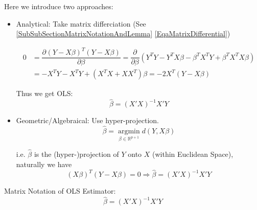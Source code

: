     Here we introduce two approaches:
\begin{itemize}[topsep=2pt,itemsep=2pt]
    \item Analytical: Take matrix differciation (See \autoref{SubSubSectionMatrixNotationAndLemma} \autoref{EqaMatrixDifferential})
    
   

\begin{align}
    0&=\dfrac{\partial^{} (Y-X\beta )^T(Y-X\beta ) }{\partial \beta ^{}} =\dfrac{\partial^{} }{\partial\beta  ^{}}(Y^TY- Y^TX\beta -\beta ^TX^TY+\beta ^TX^TX\beta )\\ 
    &=-X^TY-X^TY+(X^TX+XX^T)\beta 
    =-2X^T(Y-X\beta )
\end{align}
    
    Thus we get OLS:
    \begin{equation}
        \hat{\beta }=(X'X)^{-1}X'Y 
    \end{equation}
    
    
    \item Geometric/Algebraical: Use hyper-projection.
    \begin{equation}
        \hat{\beta }=\mathop{ \arg\min }\limits_{\beta \in \mathbb{R}^{p+1} } d(Y,X\beta )
    \end{equation}

    i.e. $ \hat{\beta } $ is the (hyper-)projection of $ Y $ onto $ X $ (within Euclidean Space), naturally we have
    \begin{equation}
        (X\beta )^T(Y-X\beta )=0\Rightarrow \hat{\beta }=(X'X)^{-1}X'Y 
    \end{equation}

\end{itemize}

\begin{point}
    Matrix Notation of OLS Estimator:
    \begin{equation}
        \hat{\beta }=(X'X)^{-1}X'Y 
    \end{equation}
\end{point}


